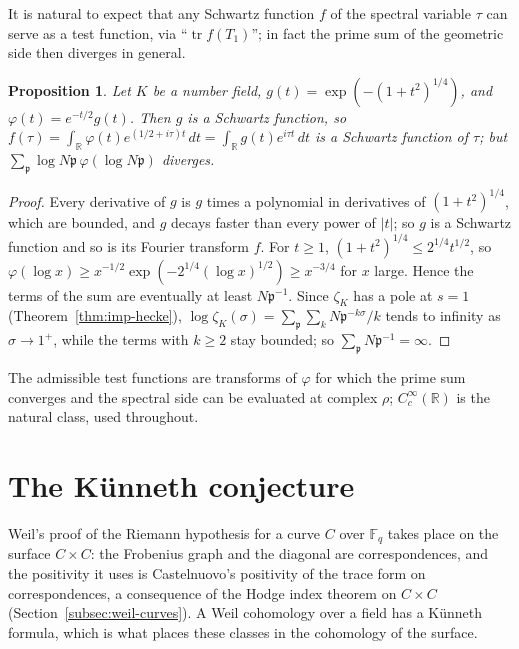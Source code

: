 \documentclass[11pt]{amsart}
\theoremstyle{plain}
\newtheorem{proposition}[theorem]{Proposition}
\theoremstyle{definition}
\theoremstyle{remark}
\numberwithin{equation}{section}
\newcommand{\R}{\mathbb{R}}
\newcommand{\F}{\mathbb{F}}
\DeclareMathOperator{\tr}{tr}
\begin{document}
It is natural to expect that any Schwartz function $f$ of the spectral
variable $\tau$ can serve as a test function, via ``$\tr f(T_1)$'';
in fact the prime sum of the geometric side then diverges in general.

\begin{proposition}\label{prop:schwartz}
Let $K$ be a number field, $g(t)=\exp(-(1+t^2)^{1/4})$, and
$\varphi(t)=e^{-t/2}g(t)$. Then $g$ is a Schwartz function, so
$f(\tau)=\int_\R\varphi(t)e^{(1/2+i\tau)t}\,dt=\int_\R g(t)e^{i\tau t}
\,dt$ is a Schwartz function of $\tau$; but
$\sum_{\mathfrak p}\log N\mathfrak p\,\varphi(\log N\mathfrak p)$
diverges.
\end{proposition}

\begin{proof}
Every derivative of $g$ is $g$ times a polynomial in derivatives of
$(1+t^2)^{1/4}$, which are bounded, and $g$ decays faster than every
power of $|t|$; so $g$ is a Schwartz function and so is its Fourier
transform $f$. For $t\ge1$, $(1+t^2)^{1/4}\le2^{1/4}t^{1/2}$, so
$\varphi(\log x)\ge x^{-1/2}\exp(-2^{1/4}(\log x)^{1/2})\ge x^{-3/4}$
for $x$ large. Hence the terms of the sum are eventually at least
$N\mathfrak p^{-1}$. Since $\zeta_K$ has a pole at $s=1$
(Theorem~\ref{thm:imp-hecke}), $\log\zeta_K(\sigma)=\sum_{\mathfrak p}
\sum_kN\mathfrak p^{-k\sigma}/k$ tends to infinity as $\sigma\to1^+$,
while the terms with $k\ge2$ stay bounded; so
$\sum_{\mathfrak p}N\mathfrak p^{-1}=\infty$.
\end{proof}

The admissible test functions are transforms of $\varphi$ for which the
prime sum converges and the spectral side can be evaluated at complex
$\rho$; $C_c^\infty(\R)$ is the natural class, used throughout.
\section{The K\"unneth conjecture}\label{sec:kunneth}

Weil's proof of the Riemann hypothesis for a curve $C$ over $\F_q$ takes
place on the surface $C\times C$: the Frobenius graph and the diagonal are
correspondences, and the positivity it uses is Castelnuovo's positivity
of the trace form on correspondences, a consequence of the Hodge index
theorem on $C\times C$ (Section~\ref{subsec:weil-curves}). A Weil
cohomology over a field has a K\"unneth formula, which is what places
these classes in the cohomology of the surface. 
\end{document}
